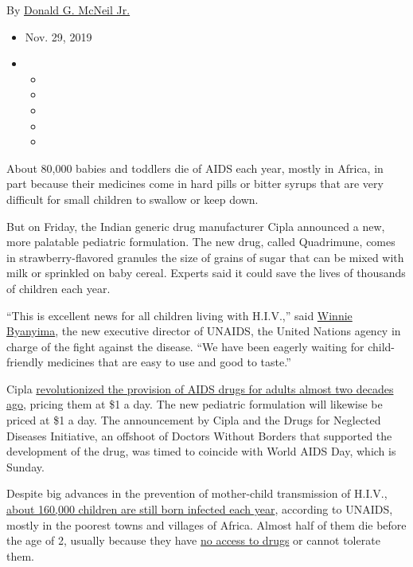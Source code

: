 By
\href{https://www.nytimes3xbfgragh.onion/by/donald-g-mcneil-jr}{Donald
G. McNeil Jr.}

\begin{itemize}
\item
  Nov. 29, 2019
\item
  \begin{itemize}
  \item
  \item
  \item
  \item
  \item
  \end{itemize}
\end{itemize}

About 80,000 babies and toddlers die of AIDS each year, mostly in
Africa, in part because their medicines come in hard pills or bitter
syrups that are very difficult for small children to swallow or keep
down.

But on Friday, the Indian generic drug manufacturer Cipla announced a
new, more palatable pediatric formulation. The new drug, called
Quadrimune, comes in strawberry-flavored granules the size of grains of
sugar that can be mixed with milk or sprinkled on baby cereal. Experts
said it could save the lives of thousands of children each year.

``This is excellent news for all children living with H.I.V.,'' said
\href{https://twitter.com/Winnie_Byanyima?ref_src=twsrc\%5Egoogle\%7Ctwcamp\%5Eserp\%7Ctwgr\%5Eauthor}{Winnie
Byanyima}, the new executive director of UNAIDS, the United Nations
agency in charge of the fight against the disease. ``We have been
eagerly waiting for child-friendly medicines that are easy to use and
good to taste.''

Cipla
\href{https://www.nytimes3xbfgragh.onion/2001/02/07/world/indian-company-offers-to-supply-aids-drugs-at-low-cost-in-africa.html}{revolutionized
the provision of AIDS drugs for adults almost two decades ago}, pricing
them at \$1 a day. The new pediatric formulation will likewise be priced
at \$1 a day. The announcement by Cipla and the Drugs for Neglected
Diseases Initiative, an offshoot of Doctors Without Borders that
supported the development of the drug, was timed to coincide with World
AIDS Day, which is Sunday.

Despite big advances in the prevention of mother-child transmission of
H.I.V., \href{https://www.unaids.org/en/resources/fact-sheet}{about
160,000 children are still born infected each year}, according to
UNAIDS, mostly in the poorest towns and villages of Africa. Almost half
of them die before the age of 2, usually because they have
\href{https://www.aidsmap.com/news/may-2019/why-has-uptake-lopinavirritonavir-oral-pellets-children-been-slow}{no
access to drugs} or cannot tolerate them.

